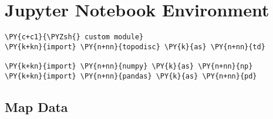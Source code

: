 \chapter{Jupyter Notebook Environment}\label{app:jupyter}

    \begin{tcolorbox}[breakable, size=fbox, boxrule=1pt, pad at break*=1mm,colback=cellbackground, colframe=cellborder]
\begin{Verbatim}[commandchars=\\\{\}]
\PY{c+c1}{\PYZsh{} custom module}
\PY{k+kn}{import} \PY{n+nn}{topodisc} \PY{k}{as} \PY{n+nn}{td}

\PY{k+kn}{import} \PY{n+nn}{numpy} \PY{k}{as} \PY{n+nn}{np}
\PY{k+kn}{import} \PY{n+nn}{pandas} \PY{k}{as} \PY{n+nn}{pd}
\end{Verbatim}
\end{tcolorbox}

    \hypertarget{map-data}{%
\section{Map Data}\label{map-data}}

